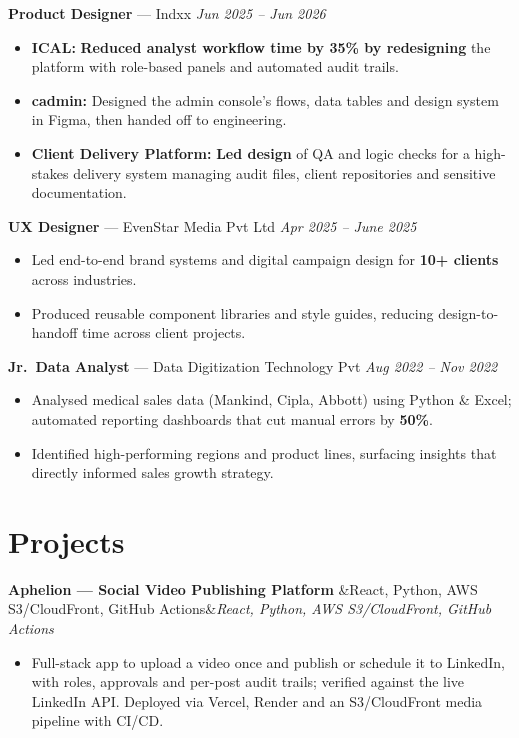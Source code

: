 \documentclass[10pt,a4paper]{article}
\newcommand{\role}[3]{%
  \vspace{5pt}%
  \textbf{#1} \textnormal{\textcolor{midgrey}{--- #2}}%
  \hfill\textcolor{midgrey}{\textit{#3}}%
  \vspace{1pt}%
}
\newcommand{\project}[2][]{%
  \vspace{5pt}%
  \textbf{#2}%
  \ifx&#1&\else\hfill\textcolor{midgrey}{\textit{#1}}\fi%
  \vspace{1pt}%
}
\begin{document}
\role{Product Designer}{Indxx}{Jun 2025 -- Jun 2026}
\begin{itemize}
  \item \textbf{ICAL:} \textbf{Reduced analyst workflow time by 35\% by redesigning} the platform with role-based panels and automated audit trails.
  \item \textbf{cadmin:} Designed the admin console's flows, data tables and design system in Figma, then handed off to engineering.
  \item \textbf{Client Delivery Platform:} \textbf{Led design} of QA and logic checks for a high-stakes delivery system managing audit files, client repositories and sensitive documentation.
\end{itemize}

\role{UX Designer}{EvenStar Media Pvt Ltd}{Apr 2025 -- June 2025}
\begin{itemize}
  \item Led end-to-end brand systems and digital campaign design for \textbf{10+ clients}
        across industries.
  \item Produced reusable component libraries and style guides, reducing design-to-handoff
        time across client projects.
\end{itemize}

\role{Jr.\ Data Analyst}{Data Digitization Technology Pvt}{Aug 2022 -- Nov 2022}
\begin{itemize}
  \item Analysed medical sales data (Mankind, Cipla, Abbott) using Python \& Excel;
        automated reporting dashboards that cut manual errors by \textbf{50\%}.
  \item Identified high-performing regions and product lines, surfacing insights that
        directly informed sales growth strategy.
\end{itemize}

\newpage
\section{Projects}

\project[React, Python, AWS S3/CloudFront, GitHub Actions]{Aphelion --- Social Video Publishing Platform}
\begin{itemize}
  \item Full-stack app to upload a video once and publish or schedule it to LinkedIn, with roles, approvals and per-post audit trails; verified against the live LinkedIn API. Deployed via Vercel, Render and an S3/CloudFront media pipeline with CI/CD.
\end{itemize}
\end{document}
